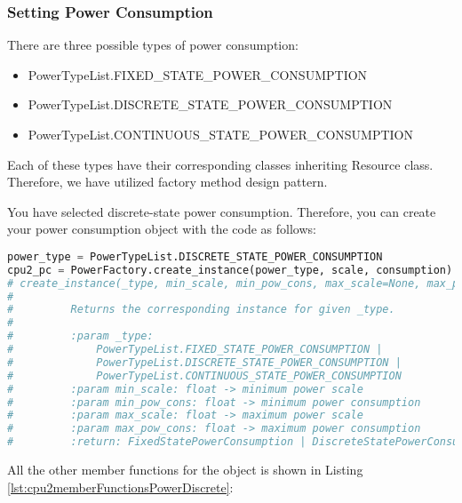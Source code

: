\documentclass[]{scrartcl}
\begin{document}
\subsubsection{Setting Power Consumption}
There are three possible types of power consumption:
\begin{itemize}
    \item \textsf{PowerTypeList.FIXED\_STATE\_POWER\_CONSUMPTION}
    \item \textsf{PowerTypeList.DISCRETE\_STATE\_POWER\_CONSUMPTION}
    \item \textsf{PowerTypeList.CONTINUOUS\_STATE\_POWER\_CONSUMPTION}
\end{itemize}
Each of these types have their corresponding classes inheriting \textsf{Resource} class. Therefore, we have utilized factory method design pattern.
        
You have selected discrete-state power consumption. Therefore, you can create your power consumption object with the code as follows:

\begin{lstlisting}[language=Python, frame=single, label={lst:cpu2settingPowerConsumptionDiscrete}, caption={Power consumption object is created for Discrete-State Power Consumption type.}]
power_type = PowerTypeList.DISCRETE_STATE_POWER_CONSUMPTION
cpu2_pc = PowerFactory.create_instance(power_type, scale, consumption)
# create_instance(_type, min_scale, min_pow_cons, max_scale=None, max_pow_cons=None) -> FixedStatePowerConsumption | DiscreteStatePowerConsumption | ContinuousStatePowerConsumption
# 
#         Returns the corresponding instance for given _type.
# 
#         :param _type:
#             PowerTypeList.FIXED_STATE_POWER_CONSUMPTION |
#             PowerTypeList.DISCRETE_STATE_POWER_CONSUMPTION |
#             PowerTypeList.CONTINUOUS_STATE_POWER_CONSUMPTION
#         :param min_scale: float -> minimum power scale
#         :param min_pow_cons: float -> minimum power consumption
#         :param max_scale: float -> maximum power scale
#         :param max_pow_cons: float -> maximum power consumption
#         :return: FixedStatePowerConsumption | DiscreteStatePowerConsumption | ContinuousStatePowerConsumption
\end{lstlisting}
        
       
All the other member functions for the object is shown in Listing \ref{lst:cpu2memberFunctionsPowerDiscrete}:
            
\end{document}
